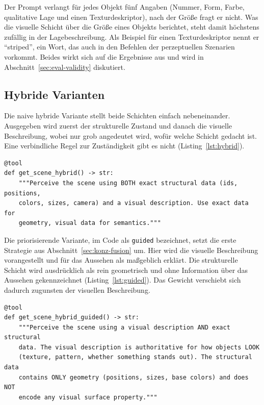 Der Prompt verlangt für jedes Objekt fünf Angaben (Nummer, Form, Farbe, qualitative Lage und einen Texturdeskriptor), nach der Größe fragt er nicht.
Was die visuelle Schicht über die Größe eines Objekts berichtet, steht damit höchstens zufällig in der Lagebeschreibung.
Als Beispiel für einen Texturdeskriptor nennt er \enquote{striped}, ein Wort, das auch in den Befehlen der perzeptuellen Szenarien vorkommt.
Beides wirkt sich auf die Ergebnisse aus und wird in Abschnitt~\ref{sec:eval-validity} diskutiert.

\subsection*{Hybride Varianten}

Die naive hybride Variante stellt beide Schichten einfach nebeneinander.
Ausgegeben wird zuerst der strukturelle Zustand und danach die visuelle Beschreibung, wobei nur grob angedeutet wird, wofür welche Schicht gedacht ist.
Eine verbindliche Regel zur Zuständigkeit gibt es nicht (Listing~\ref{lst:hybrid}).

\begin{listing}[htbp]
\begin{verbatim}
@tool
def get_scene_hybrid() -> str:
    """Perceive the scene using BOTH exact structural data (ids, positions,
    colors, sizes, camera) and a visual description. Use exact data for
    geometry, visual data for semantics."""
\end{verbatim}
\caption{Wahrnehmungswerkzeug der naiven hybriden Variante.}
\label{lst:hybrid}
\end{listing}

Die priorisierende Variante, im Code als \texttt{guided} bezeichnet, setzt die erste Strategie aus Abschnitt~\ref{sec:konz-fusion} um.
Hier wird die visuelle Beschreibung vorangestellt und für das Aussehen als maßgeblich erklärt.
Die strukturelle Schicht wird ausdrücklich als rein geometrisch und ohne Information über das Aussehen gekennzeichnet (Listing~\ref{lst:guided}).
Das Gewicht verschiebt sich dadurch zugunsten der visuellen Beschreibung.

\begin{listing}[htbp]
\begin{verbatim}
@tool
def get_scene_hybrid_guided() -> str:
    """Perceive the scene using a visual description AND exact structural
    data. The visual description is authoritative for how objects LOOK
    (texture, pattern, whether something stands out). The structural data
    contains ONLY geometry (positions, sizes, base colors) and does NOT
    encode any visual surface property."""
\end{verbatim}
\caption{Wahrnehmungswerkzeug der priorisierenden Variante.}
\label{lst:guided}
\end{listing}

